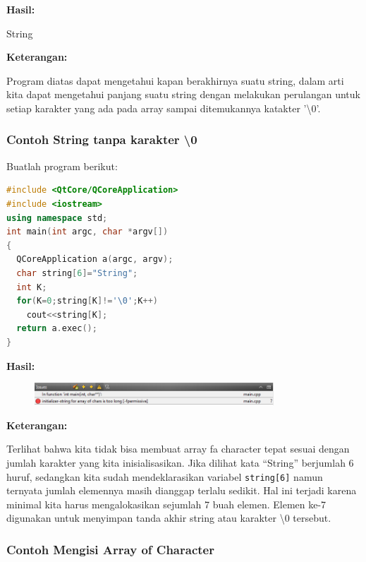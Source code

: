 \textbf{Hasil:}

\begin{lcverbatim}
String
\end{lcverbatim}

\textbf{Keterangan:}

Program diatas dapat mengetahui kapan berakhirnya suatu string, dalam
arti kita dapat mengetahui panjang suatu string dengan melakukan
perulangan untuk setiap karakter yang ada pada array sampai ditemukannya
katakter '\textbackslash0'.

\subsubsection*{Contoh  String tanpa karakter \textbackslash{0}}

Buatlah program berikut:

\begin{lstlisting}[language=c++, caption=String tanpa karakter \textbackslash{0}, label=contoh3-15]
#include <QtCore/QCoreApplication>
#include <iostream>
using namespace std;
int main(int argc, char *argv[])
{
  QCoreApplication a(argc, argv);
  char string[6]="String";
  int K;
  for(K=0;string[K]!='\0';K++)
    cout<<string[K];
  return a.exec();
}
\end{lstlisting}

\textbf{Hasil:}

\begin{figure}[htbp]
\centering
\includegraphics[width=0.8\textwidth]{../manuscript/images/capture2-7.PNG}

\end{figure}

\textbf{Keterangan:}

Terlihat bahwa kita tidak bisa membuat array fa character tepat sesuai
dengan jumlah karakter yang kita inisialisasikan. Jika dilihat kata
``String'' berjumlah 6 huruf, sedangkan kita sudah mendeklarasikan
variabel \texttt{string{[}6{]}} namun ternyata jumlah elemennya masih
dianggap terlalu sedikit. Hal ini terjadi karena minimal kita harus
mengalokasikan sejumlah 7 buah elemen. Elemen ke-7 digunakan untuk
menyimpan tanda akhir string atau karakter \textbackslash0 tersebut.

\subsubsection*{Contoh  Mengisi Array of Character}


